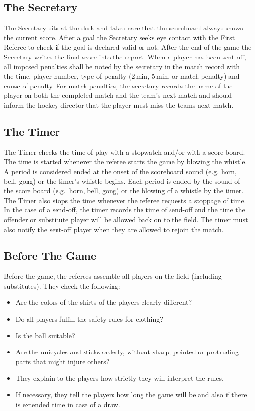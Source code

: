 \subsection{The Secretary}
The Secretary sits at the desk and takes care that the scoreboard always shows the current score.
After a goal the Secretary seeks eye contact with the First Referee to check if the goal is declared valid or not.
After the end of the game the Secretary writes the final score into the report.
When a player has been sent-off, all imposed penalties shall be noted by the secretary in the match record with the time, player number, type of penalty (2\,min, 5\,min, or match penalty) and cause of penalty.
For match penalties, the secretary records the name of the player on both the completed match and the team’s next match and should inform the hockey director that the player must miss the teams next match.

\subsection{The Timer}
The Timer checks the time of play with a stopwatch and/or with a score board.
The time is started whenever the referee starts the game by blowing the whistle.
A period is considered ended at the onset of the scoreboard sound (e.g. horn, bell, gong) or the timer’s whistle begins.
Each period is ended by the sound of the score board (e.g.\ horn, bell, gong) or the blowing of a whistle by the timer.
The Timer also stops the time whenever the referee requests a stoppage of time.
In the case of a send-off, the timer records the time of send-off and the time the offender or substitute player will be allowed back on to the field.
The timer must also notify the sent-off player when they are allowed to rejoin the match.

\subsection{Before The Game}
Before the game, the referees assemble all players on the field (including substitutes).
They check the following:
\begin{itemize}
\item Are the colors of the shirts of the players clearly different?
\item Do all players fulfill the safety rules for clothing?
\item Is the ball suitable?
\item Are the unicycles and sticks orderly, without sharp, pointed or protruding parts that might injure others?
\item They explain to the players how strictly they will interpret the rules.
\item If necessary, they tell the players how long the game will be and also if there is extended time in case of a draw.
\end{itemize}

